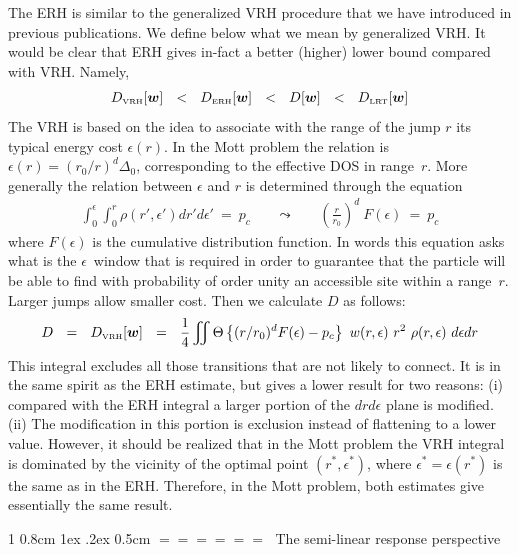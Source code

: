 \documentclass[onecolumn,fleqn,notitlepage,secnumarabic]{revtex4}
\makeatletter
\newcommand{\tbox}[1]{\mbox{\tiny #1}}
\newcommand{\beq}{\begin{eqnarray}}
\newcommand{\eeq}{\end{eqnarray}}
\def\section{%
  \@startsection
    {section}%
    {1}%
    {\z@}%
    {0.8cm \@plus1ex \@minus .2ex}%
    {0.5cm}%
    {\Large\bf $=\!=\!=\!=\!=\!=\;$}%
}%
\makeatother
\begin{document}
The ERH is similar to the generalized VRH procedure 
that we have introduced in previous publications.
We define below what we mean by generalized VRH. 
It would be clear that ERH gives in-fact a better (higher) 
lower bound compared with VRH. Namely, 
%
\beq
D_{\tbox{VRH}}[\bm{w}]  
\ \ < \ \ D_{\tbox{ERH}}[\bm{w}]
\ \ < \ \ D[\bm{w}]
\ \ < \ \ D_{\tbox{LRT}}[\bm{w}]
\eeq
%
The VRH is based on the idea to associate
with the range of the jump $r$ its typical 
energy cost $\epsilon(r)$. In the Mott problem 
the relation is $\epsilon(r) = (r_0/r)^d \Delta_0$, 
corresponding to the effective DOS in range~$r$. 
More generally the relation between $\epsilon$ and $r$ 
is determined through the equation 
%
\beq
\int_0^{\epsilon} \int_0^{r} \rho(r',\epsilon')  dr'd\epsilon' \  = \  p_c 
\ \ \ \ \ \ \ \ \leadsto \ \ \ \ \ \ \ \ 
\left(\frac{r}{r_0}\right)^d \ F(\epsilon) \ = \ p_c
\eeq
%
where $F(\epsilon)$ is the cumulative distribution function.
In words this equation asks what is the $\epsilon$~window that 
is required in order to guarantee that the particle will be able 
to find with probability of order unity an accessible site within 
a range~$r$. Larger jumps allow smaller cost. 
Then we calculate $D$ as follows: 
%
\beq
D \ \ = \ \ D_{\tbox{VRH}}[\bm{w}]  \ \ = \ \ 
\frac{1}{4}\iint \Theta\left\{ (r/r_0)^d F(\epsilon) - p_c \right\} \ w(r,\epsilon) \ r^2  \ \rho(r,\epsilon) \ d\epsilon dr
\eeq
%
This integral excludes all those transitions that are not likely to connect. 
It is in the same spirit as the ERH estimate, but gives a lower result 
for two reasons: (i) compared with the ERH integral a larger portion of 
the $drd\epsilon$ plane is modified. (ii) The modification in this portion 
is exclusion instead of flattening to a lower value.
However, it should be realized that in the Mott problem the VRH 
integral is dominated by the vicinity of the optimal point ${(r^*,\epsilon^*)}$, 
where $\epsilon^*=\epsilon(r^*)$ is the same as in the ERH. 
Therefore, in the Mott problem, both estimates give essentially the same result.


\section{The semi-linear response perspective}
\end{document}

